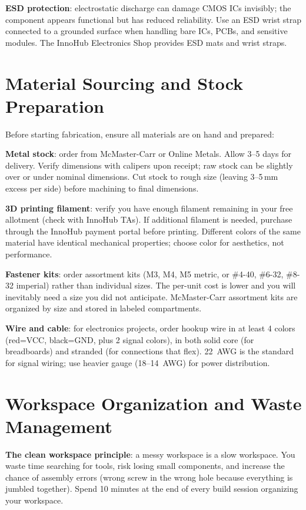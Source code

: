 \textbf{ESD protection}: electrostatic discharge can damage CMOS ICs invisibly; the component appears functional but has reduced reliability. Use an ESD wrist strap connected to a grounded surface when handling bare ICs, PCBs, and sensitive modules. The InnoHub Electronics Shop provides ESD mats and wrist straps.



\section{Material Sourcing and Stock Preparation}
Before starting fabrication, ensure all materials are on hand and prepared:

\textbf{Metal stock}: order from McMaster-Carr or Online Metals. Allow 3--5 days for delivery. Verify dimensions with calipers upon receipt; raw stock can be slightly over or under nominal dimensions. Cut stock to rough size (leaving 3--5\,mm excess per side) before machining to final dimensions.

\textbf{3D printing filament}: verify you have enough filament remaining in your free allotment (check with InnoHub TAs). If additional filament is needed, purchase through the InnoHub payment portal before printing. Different colors of the same material have identical mechanical properties; choose color for aesthetics, not performance.

\textbf{Fastener kits}: order assortment kits (M3, M4, M5 metric, or \#4-40, \#6-32, \#8-32 imperial) rather than individual sizes. The per-unit cost is lower and you will inevitably need a size you did not anticipate. McMaster-Carr assortment kits are organized by size and stored in labeled compartments.

\textbf{Wire and cable}: for electronics projects, order hookup wire in at least 4 colors (red=VCC, black=GND, plus 2 signal colors), in both solid core (for breadboards) and stranded (for connections that flex). 22~AWG is the standard for signal wiring; use heavier gauge (18--14~AWG) for power distribution.

\section{Workspace Organization and Waste Management}
\textbf{The clean workspace principle}: a messy workspace is a slow workspace. You waste time searching for tools, risk losing small components, and increase the chance of assembly errors (wrong screw in the wrong hole because everything is jumbled together). Spend 10 minutes at the end of every build session organizing your workspace.

